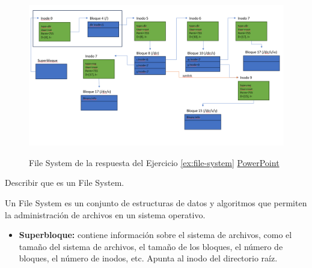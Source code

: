 \documentclass[../main.tex]{subfiles}
\begin{document}
    \begin{figure}[ht]
        \centering
        \includegraphics[scale=0.3]{../images/file-system.png}
        \label{fig:file-system}
        \caption{File System de la respuesta del Ejercicio \ref{ex:file-system} \href{https://fiubaar-my.sharepoint.com/:p:/g/personal/lcondoriz_fi_uba_ar/ERIlPc9eeJNOg9fCVzz2cjgBsjhy15nYJswfVTfWUNNcTg?e=KJvO2T}{PowerPoint}}
    \end{figure}

    \begin{exercise}
        Describir que es un File System.
        \begin{answer}
            Un File System es un conjunto de estructuras de datos y algoritmos que permiten la administración de archivos en un sistema operativo.
            \begin{itemize}
                \item \textbf{Superbloque:} contiene información sobre el sistema de archivos, como el tamaño del sistema de archivos, el tamaño de los bloques, el número de bloques, el número de inodos, etc. Apunta al inodo del directorio raíz.
            \end{itemize}
        \end{answer}
    \end{exercise}
\end{document}
